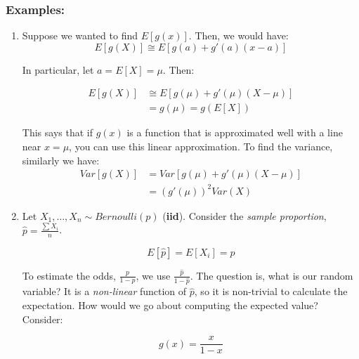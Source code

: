 \documentclass{article}
\begin{document}
\subsubsection*{Examples:}
\begin{enumerate}
    \item Suppose we wanted to find $E[g(x)]$. Then, we would have:
        \begin{equation*}
            E[g(X)] \cong E[g(a) + g'(a)(x-a)]
        \end{equation*}
        
        \noindent In particular, let $a = E[X] = \mu$. Then:
        
        \begin{equation*}
        \begin{split}
            E[g(X)] &\cong E[g(\mu) + g'(\mu)(X-\mu)]\\
                &= g(\mu) = g(E[X])
        \end{split}
        \end{equation*}
        
        \noindent This says that if $g(x)$ is a function that is approximated well with a line near $x=\mu$, you can use this linear approximation. To find the variance, similarly we have:
        \begin{equation*}
            \begin{split}
                Var[g(X)] &= Var[g(\mu) + g'(\mu)(X-\mu)]\\
                    &= \left(g'(\mu) \right)^2 Var(X)
            \end{split}
        \end{equation*}
        
    \item Let $X_1,\dots,X_n \sim Bernoulli(p)$ (\textbf{iid}). Consider the \textit{sample proportion}, $\hat{p} = \frac{\sum X_i}{n}$.
    
    \begin{equation*}
        E[\hat{p}] = E[X_i] = p
    \end{equation*}
    
    To estimate the odds, $\frac{p}{1-p}$, we use $\frac{\hat{p}}{1-\hat{p}}$. The question is, what is our random variable? It is a \textit{non-linear} function of $\hat{p}$, so it is non-trivial to calculate the expectation. How would we go about computing the expected value? Consider:
    
    \begin{equation*}
        g(x) = \frac{x}{1-x}
    \end{equation*}
    

\end{enumerate}
\end{document}
